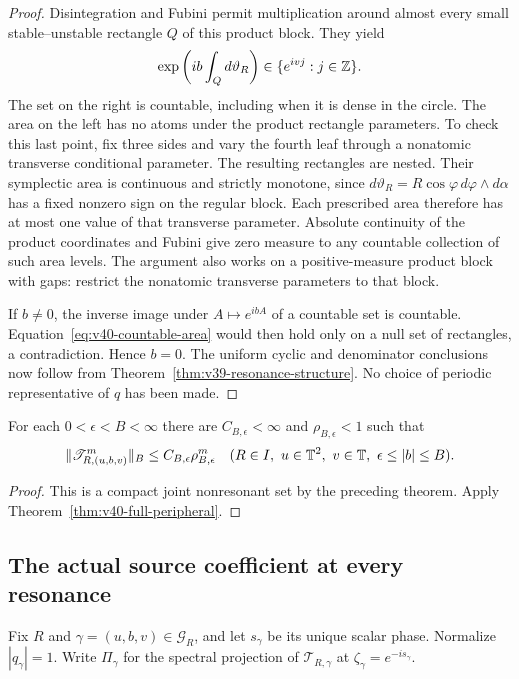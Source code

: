 \begin{proof}
Disintegration and Fubini permit multiplication around almost every
small stable--unstable rectangle $Q$ of this product block. They yield
\begin{equation}\label{eq:v40-countable-area}
 \exp\left(ib\int_Q d\vartheta_R\right)\in
                          \{e^{ivj}:j\in\Z\}.
\end{equation}
The set on the right is countable, including when it is dense in the
circle. The area on the left has no atoms under the product
rectangle parameters. To check this last point, fix three sides and
vary the fourth leaf through a nonatomic transverse conditional
parameter. The resulting rectangles are nested. Their symplectic
area is continuous and strictly monotone, since
$d\vartheta_R=R\cos\varphi\,d\varphi\wedge d\alpha$ has a fixed
nonzero sign on the regular block. Each prescribed area therefore
has at most one value of that transverse parameter. Absolute
continuity of the product coordinates and Fubini give zero measure
to any countable collection of such area levels. The argument also
works on a positive-measure product block with gaps: restrict the
nonatomic transverse parameters to that block.

If $b\ne0$, the inverse image under $A\mapsto e^{ibA}$ of a
countable set is countable. Equation~\eqref{eq:v40-countable-area}
would then hold only on a null set of rectangles, a contradiction.
Hence $b=0$. The uniform cyclic and denominator conclusions now
follow from Theorem~\ref{thm:v39-resonance-structure}. No choice of
periodic representative of $q$ has been made.
\end{proof}

\begin{corollary}
\label{cor:v40-roof-annulus-gap}
For each $0<\epsilon<B<\infty$ there are $C_{B,\epsilon}<\infty$
and $\rho_{B,\epsilon}<1$ such that
\[
 \|\mathscr T_{R,(u,b,v)}^m\|_B\le C_{B,\epsilon}\rho_{B,\epsilon}^m
 \quad(R\in I,\ u\in\mathbb T^2,\ v\in\mathbb T,\ \epsilon\le|b|\le B).
\]
\end{corollary}
\begin{proof}
This is a compact joint nonresonant set by the preceding theorem.
Apply Theorem~\ref{thm:v40-full-peripheral}.
\end{proof}

\subsection{The actual source coefficient at every resonance}
Fix $R$ and $\gamma=(u,b,v)\in\mathcal G_R$, and let $s_\gamma$ be
its unique scalar phase. Normalize $|q_\gamma|=1$. Write
$\Pi_\gamma$ for the spectral projection of $\mathscr T_{R,\gamma}$
at $\zeta_\gamma=e^{-is_\gamma}$.

